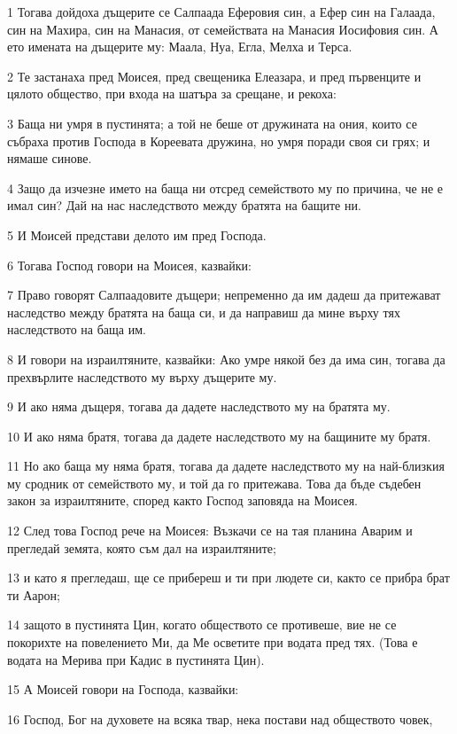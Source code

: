 \par 1 Тогава дойдоха дъщерите се Салпаада Еферовия син, а Ефер син на Галаада, син на Махира, син на Манасия, от семействата на Манасия Иосифовия син. А ето имената на дъщерите му: Маала, Нуа, Егла, Мелха и Терса.
\par 2 Те застанаха пред Моисея, пред свещеника Елеазара, и пред първенците и цялото общество, при входа на шатъра за срещане, и рекоха:
\par 3 Баща ни умря в пустинята; а той не беше от дружината на ония, които се събраха против Господа в Кореевата дружина, но умря поради своя си грях; и нямаше синове.
\par 4 Защо да изчезне името на баща ни отсред семейството му по причина, че не е имал син? Дай на нас наследството между братята на бащите ни.
\par 5 И Моисей представи делото им пред Господа.
\par 6 Тогава Господ говори на Моисея, казвайки:
\par 7 Право говорят Салпаадовите дъщери; непременно да им дадеш да притежават наследство между братята на баща си, и да направиш да мине върху тях наследството на баща им.
\par 8 И говори на израилтяните, казвайки: Ако умре някой без да има син, тогава да прехвърлите наследството му върху дъщерите му.
\par 9 И ако няма дъщеря, тогава да дадете наследството му на братята му.
\par 10 И ако няма братя, тогава да дадете наследството му на бащините му братя.
\par 11 Но ако баща му няма братя, тогава да дадете наследството му на най-близкия му сродник от семейството му, и той да го притежава. Това да бъде съдебен закон за израилтяните, според както Господ заповяда на Моисея.
\par 12 След това Господ рече на Моисея: Възкачи се на тая планина Аварим и прегледай земята, която съм дал на израилтяните;
\par 13 и като я прегледаш, ще се прибереш и ти при людете си, както се прибра брат ти Аарон;
\par 14 защото в пустинята Цин, когато обществото се противеше, вие не се покорихте на повелението Ми, да Ме осветите при водата пред тях. (Това е водата на Мерива при Кадис в пустинята Цин).
\par 15 А Моисей говори на Господа, казвайки:
\par 16 Господ, Бог на духовете на всяка твар, нека постави над обществото човек,
